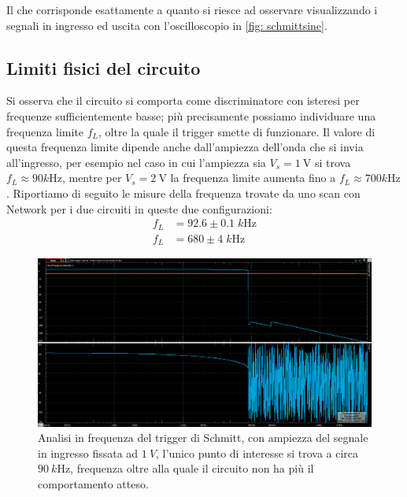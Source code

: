\documentclass[10pt, a4paper, italian]{article}
\begin{document}
Il che corrisponde esattamente a quanto si riesce ad osservare visualizzando
i segnali in ingresso ed uscita con l'oscilloscopio in \cref{fig: schmittsine}.

\subsection{Limiti fisici del circuito}\label{sub: trglim}
Si osserva che il circuito si comporta come discriminatore con isteresi per
frequenze sufficientemente basse; più precisamente possiamo individuare una
frequenza limite $f_L$, oltre la quale il trigger smette di funzionare.
Il valore di questa frequenza limite dipende anche dall'ampiezza dell'onda che
si invia all'ingresso, per esempio nel caso in cui l'ampiezza sia
$V_s = \SI{1}{\V}$ si trova $f_L \approx 90 \si{k\Hz}$, mentre per
$V_s = \SI{2}{\V}$ la frequenza limite aumenta fino a
$f_L \approx 700 \si{k\Hz}$. Riportiamo di seguito le misure della frequenza
trovate da uno scan con Network per i due circuiti in queste due
configurazioni:
\begin{align*}
f_L &= 92.6 \pm 0.1 \; \si{k\Hz} \\
f_L &= 680 \pm 4 \; \si{k\Hz}
\end{align*}

\begin{figure}[htbp]
\centering
\includegraphics[scale=0.335]{bodeschmitt1V100Hz5MHz}
\caption{Analisi in frequenza del trigger di Schmitt, con ampiezza del segnale
in ingresso fissata ad $\SI{1}{V}$, l'unico punto di interesse si trova a
circa $\SI{90}{k\Hz}$, frequenza oltre alla quale il circuito non ha più
il comportamento atteso.}
\end{figure}
\end{document}
